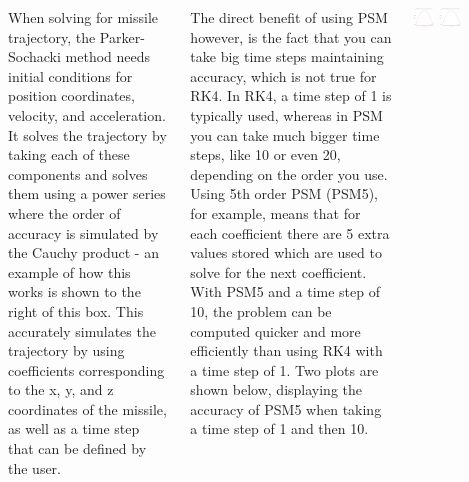 \documentclass[25pt, a0paper, portrait]{tikzposter}
\begin{document}
\begin{columns}
    {
        When solving for missile trajectory, the Parker-Sochacki method needs initial conditions for 
        position coordinates, velocity, and acceleration.  It solves the trajectory by taking each 
        of these components and solves them using a power series where the order of accuracy is 
        simulated by the Cauchy product - an example of how this works is shown to the right of 
        this box.  This accurately simulates the trajectory by using coefficients corresponding to 
        the x, y, and z coordinates of the missile, as well as a time step that can be defined by 
        the user. 

        \vspace{.5cm}
        The direct benefit of using PSM however, is the fact that you can take big time steps 
        maintaining accuracy, which is not true for RK4.  In RK4, a time step of 1 is typically 
        used, whereas in PSM you can take much bigger time steps, like 10 or even 20, depending on 
        the order you use.  Using 5th order PSM (PSM5), for example, means that for each coefficient 
        there are 5 extra values stored which are used to solve for the next coefficient. With PSM5 
        and a time step of 10, the problem can be computed quicker and more efficiently than using 
        RK4 with a time step of 1.  Two plots are shown below, displaying the accuracy of PSM5 when 
        taking a time step of 1 and then 10.  
    }
    {
        \begin{tikzfigure}
        \includegraphics[width=0.22\textwidth]{images/PSM5 TS1 Plot.png}
        \hspace*{1.3cm}
        \includegraphics[width=0.22\textwidth]{images/PSM5 TS10 Plot.png}    
        \end{tikzfigure}
        \vspace{.3cm}
}
\end{columns}
\end{document}
